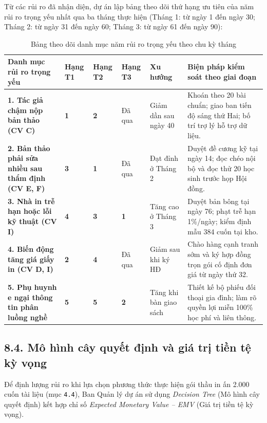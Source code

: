 Từ các rủi ro đã nhận diện, dự án lập bảng theo dõi thứ hạng ưu tiên của năm rủi ro trọng yếu nhất qua ba tháng thực hiện (Tháng 1: từ ngày 1 đến ngày 30; Tháng 2: từ ngày 31 đến ngày 60; Tháng 3: từ ngày 61 đến ngày 90):

\begin{table}[htbp]
\centering
\caption{Bảng theo dõi danh mục năm rủi ro trọng yếu theo chu kỳ tháng}
\label{tab:rui_ro_thang}
\small
{}
\begin{tabularx}{\textwidth}{|Y|C{1.1cm}|C{1.1cm}|C{1.1cm}|p{2.2cm}|Y|}
\hline
\textbf{Danh mục rủi ro trọng yếu} & \textbf{Hạng T1} & \textbf{Hạng T2} & \textbf{Hạng T3} & \textbf{Xu hướng} & \textbf{Biện pháp kiểm soát theo giai đoạn} \\
\hline
\textbf{1. Tác giả chậm nộp bản thảo (CV C)} & \textbf{1} & \textbf{2} & Đã qua & Giảm dần sau ngày 40 & Khoán theo 20 bài chuẩn; giao ban tiến độ sáng thứ Hai; bố trí trợ lý hỗ trợ dữ liệu. \\
\hline
\textbf{2. Bản thảo phải sửa nhiều sau thẩm định (CV E, F)} & \textbf{3} & \textbf{1} & Đã qua & Đạt đỉnh ở Tháng 2 & Duyệt đề cương kỹ tại ngày 14; đọc chéo nội bộ và đọc thử 20 học sinh trước họp Hội đồng. \\
\hline
\textbf{3. Nhà in trễ hạn hoặc lỗi kỹ thuật (CV I)} & \textbf{4} & \textbf{3} & \textbf{1} & Tăng cao ở Tháng 3 & Duyệt bản bông tại ngày 76; phạt trễ hạn 1\%/ngày; kiểm định mẫu 384 cuốn tại kho. \\
\hline
\textbf{4. Biến động tăng giá giấy in (CV D, I)} & \textbf{2} & \textbf{4} & Đã qua & Giảm sau khi ký HĐ & Chào hàng cạnh tranh sớm và ký hợp đồng trọn gói cố định đơn giá từ ngày thứ 32. \\
\hline
\textbf{5. Phụ huynh e ngại thông tin phân luồng nghề} & \textbf{5} & \textbf{5} & \textbf{2} & Tăng khi bàn giao sách & Thiết kế bộ phiếu đối thoại gia đình; làm rõ quyền lợi miễn 100\% học phí và liên thông. \\
\hline
\end{tabularx}
\end{table}

\subsection{8.4. Mô hình cây quyết định và giá trị tiền tệ kỳ vọng}

Để định lượng rủi ro khi lựa chọn phương thức thực hiện gói thầu in ấn 2.000 cuốn tài liệu (mục \texttt{4.4}), Ban Quản lý dự án sử dụng \textit{Decision Tree} (Mô hình cây quyết định) kết hợp chỉ số \textit{Expected Monetary Value -- EMV} (Giá trị tiền tệ kỳ vọng).

